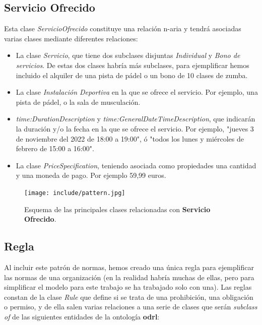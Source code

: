 \documentclass[a4paper,12pt]{article}
\begin{document}
	\subsection{Servicio Ofrecido}
	
	Esta clase \textit{ServicioOfrecido} constituye una relación n-aria y tendrá asociadas varias clases mediante diferentes relaciones:
	
	\begin{itemize}
		\item La clase \textit{Servicio}, que tiene dos subclases disjuntas \textit{Individual} y \textit{Bono de servicios}. De estas dos clases habría más subclases, para ejemplificar hemos incluido el alquiler de una pista de pádel o un bono de 10 clases de zumba.
		\item La clase \textit{Instalación Deportiva} en la que se ofrece el servicio. Por ejemplo, una pista de pádel, o la sala de musculación.
		\item \textit{time:DurationDescription} y \textit{time:GeneralDateTimeDescription}, que indicarán la duración y/o la fecha en la que se ofrece el servicio. Por ejemplo, "jueves 3 de noviembre del 2022 de 18:00 a 19:00", ó "todos los lunes y miércoles de febrero de 15:00 a 16:00".
		\item La clase \textit{PriceSpecification}, teniendo asociada como propiedades una cantidad y una moneda de pago. Por ejemplo 59,99 euros.
	\end{itemize}
	
	\begin{figure}[H]
		\centering
		\texttt{[image: include/pattern.jpg]}
		\caption{Esquema de las principales clases relacionadas con \textbf{Servicio Ofrecido}.}
	\end{figure}
	
	\subsection{Regla}
	
	Al incluir este patrón de normas, hemos creado una única regla para ejemplificar las normas de
	una organización (en la realidad habría muchas de ellas, pero para simplificar el modelo para este trabajo se ha trabajado solo con una). Las reglas constan de la clase \textit{Rule} que define si se trata de una prohibición, una obligación o permiso, y de ella salen varias relaciones a una serie de clases que serán \textit{subclass of} de las siguientes entidades de la ontología \textbf{odrl}:
	
\end{document}
